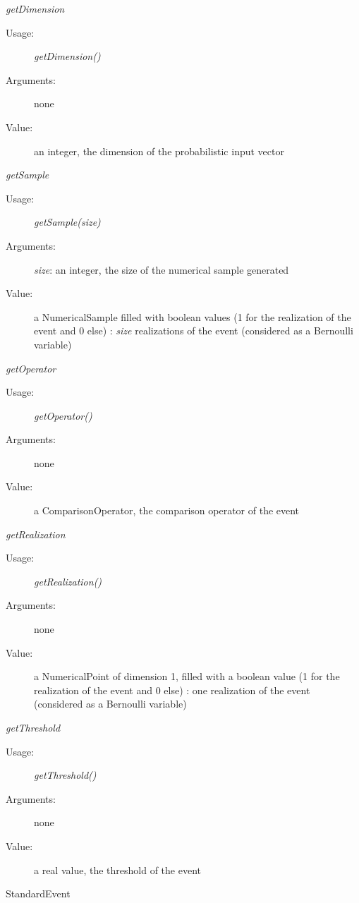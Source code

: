 \begin{description}
\begin{description}
\item \textit{getDimension}
\begin{description}
\item[Usage:] \textit{getDimension()}
\item[Arguments:] none
\item[Value:]  an integer, the dimension of the probabilistic input vector
\end{description}
\bigskip
\item \textit{getSample}
\begin{description}
\item[Usage:] \textit{getSample(size)}
\item[Arguments:] \textit{size}: an integer, the size of the numerical sample generated
\item[Value:]  a NumericalSample filled with boolean values (1 for the realization of the event and 0 else) : \textit{size} realizations of the event (considered as a Bernoulli variable)
\end{description}
\bigskip
\item \textit{getOperator}
\begin{description}
\item[Usage:] \textit{getOperator()}
\item[Arguments:] none
\item[Value:]  a ComparisonOperator, the comparison operator of the event
\end{description}
\bigskip
\item \textit{getRealization}
\begin{description}
\item[Usage:] \textit{getRealization()}
\item[Arguments:] none
\item[Value:]  a NumericalPoint of dimension 1, filled with a boolean value (1 for the realization of the event and 0 else) : one realization of the event (considered as a Bernoulli variable)
\end{description}
\bigskip
\item \textit{getThreshold}
\begin{description}
\item[Usage:] \textit{getThreshold()}
\item[Arguments:] none
\item[Value:]  a real value, the threshold of the event
\end{description}
\bigskip
\end{description}

\item[Derivative Class :] StandardEvent

\end{description}

